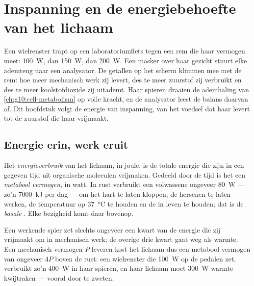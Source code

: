 \chapter{Inspanning en de energiebehoefte van het lichaam}\label{ch:g10:exercise-and-energy}

Een wielrenster trapt op een laboratoriumfiets tegen een rem die haar
vermogen meet: \qty{100}{W}, dan \qty{150}{W}, dan \qty{200}{W}. Een
masker over haar gezicht stuurt elke ademteug naar een analysator. De
getallen op het scherm klimmen mee met de rem: hoe meer mechanisch werk
zij levert, des te meer zuurstof zij verbruikt en des te meer
koolstofdioxide zij uitademt. Haar spieren draaien de ademhaling van
\cref{ch:g10:cell-metabolism} op volle kracht, en de analysator leest de
balans daarvan af. Dit hoofdstuk volgt de energie van inspanning, van
het voedsel dat haar levert tot de zuurstof die haar vrijmaakt.

\section{Energie erin, werk eruit}

\begin{definition}[Energieverbruik]\label{def:g10:exercise-and-energy:expenditure}
Het \emph{energieverbruik} van het lichaam, in
joule, is de totale energie die zijn  in een gegeven tijd uit
organische moleculen vrijmaken. Gedeeld door de tijd is het een
\emph{metabool vermogen}, in watt. In rust verbruikt een volwassene
ongeveer \qty{80}{W} --- zo'n \qty{7000}{kJ} per dag --- om het hart te
laten kloppen, de hersenen te laten werken, de temperatuur op
\qty{37}{\celsius} te houden en de  in leven te houden; dat is de
\emph{basale }. Elke bezigheid komt daar bovenop.
\end{definition}

\begin{proposition}\label{prop:g10:exercise-and-energy:efficiency}
Een werkende spier zet slechts ongeveer een kwart van de energie die zij
vrijmaakt om in mechanisch werk; de overige drie kwart gaat weg als
warmte. Een mechanisch vermogen $P$ leveren kost het lichaam dus een
metabool vermogen van ongeveer $4P$ boven de rust: een wielrenster die
\qty{100}{W} op de pedalen zet, verbruikt zo'n \qty{400}{W} in haar
spieren, en haar lichaam moet \qty{300}{W} warmte kwijtraken --- vooral
door te zweten.
\end{proposition}
\admitted

